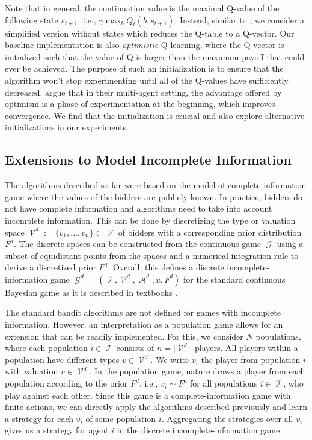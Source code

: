 \documentclass{article}
\DeclareMathOperator{\Acal}{\mathcal{A}}
\DeclareMathOperator{\Gcal}{\mathcal{G}}
\DeclareMathOperator{\Ical}{\mathcal{I}}
\DeclareMathOperator{\Vcal}{\mathcal{V}}
\begin{document}
Note that in general, the continuation value is the maximal Q-value of the following state $s_{t+1}$, i.e., $\gamma \max_b Q_t(b, s_{t+1})$. Instead, similar to \citet{banchio2022artificial}, we consider a simplified version without states which reduces the Q-table to a Q-vector. Our baseline implementation is also \textit{optimistic} Q-learning, where the Q-vector is initialized such that the value of Q is larger than the maximum payoff that could ever be achieved. The purpose of such an initialization is to ensure that the algorithm won’t stop experimenting until all of the Q-values have sufficiently decreased. \citet{banchio2022artificial} argue that in their multi-agent setting, the advantage offered by optimism is a phase of experimentation at the beginning, which improves convergence. We find that the initialization is crucial and also explore alternative initializations in our experiments. 

\subsection{Extensions to Model Incomplete Information} \label{sec:pop_game}

The algorithms described so far were based on the model of complete-information game where the values of the bidders are publicly known. 
In practice, bidders do not have complete information and algorithms need to take into account incomplete information.
This can be done by discretizing the type or valuation space $\Vcal^d := \{v_1, \dots, v_n \} \subset \Vcal$ of bidders with a corresponding prior distribution $F^d$. 
The discrete spaces can be constructed from the continuous game $\Gcal$ using a subset of equidistant points from the spaces and a numerical integration rule to derive a discretized prior $F^d$.
Overall, this defines a discrete incomplete-information game $\Gcal^d = (\Ical, \Vcal^d, \Acal^d, u, F^d)$ for the standard continuous Bayesian game as it is described in textbooks \citep{krishna2009auction}.

The standard bandit algorithms are not defined for games with incomplete information. However, an interpretation as a population game \citep{hartline2015NoRegretLearningBayesian} allows for an extension that can be readily implemented. 
For this, we consider $N$ populations, where each population $i \in \Ical$ consists of $n = \vert \Vcal^d \vert$ players. All players within a population have different types $v \in \Vcal^d$. We write $v_i$ the player from population $i$ with valuation $v \in \Vcal^d$. In the population game, nature draws a player from each population according to the prior $F^d$, i.e., $v_i \sim F^d$ for all populations $i \in \Ical$, who play against each other. Since this game is a complete-information game with finite actions, we can directly apply the algorithms described previously and learn a strategy for each $v_i$ of some population $i$.
Aggregating the strategies over all $v_i$ gives us a strategy for agent $i$ in the discrete incomplete-information game.
\end{document}
